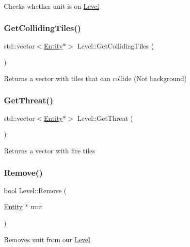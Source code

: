 Checks whether unit is on \mbox{\hyperlink{class_level}{Level}} \mbox{\label{class_level_a028dcbbb085a3d587fcd3ac14eddb103}} 
\subsubsection{\texorpdfstring{GetCollidingTiles()}{GetCollidingTiles()}}
{\footnotesize\ttfamily std\+::vector$<$\mbox{\hyperlink{class_entity}{Entity}}$\ast$$>$ Level\+::\+Get\+Colliding\+Tiles (\begin{DoxyParamCaption}{ }\end{DoxyParamCaption})}

Returns a vector with tiles that can collide (Not background) \mbox{\label{class_level_a5eff8099cd1bd25d3f40286956ddbf9a}} 
\subsubsection{\texorpdfstring{GetThreat()}{GetThreat()}}
{\footnotesize\ttfamily std\+::vector$<$\mbox{\hyperlink{class_entity}{Entity}}$\ast$$>$ Level\+::\+Get\+Threat (\begin{DoxyParamCaption}{ }\end{DoxyParamCaption})}

Returns a vector with fire tiles \mbox{\label{class_level_a30421d6ae3d5d0c71e2bca97a6b34901}} 
\subsubsection{\texorpdfstring{Remove()}{Remove()}}
{\footnotesize\ttfamily bool Level\+::\+Remove (\begin{DoxyParamCaption}\item[{\mbox{\hyperlink{class_entity}{Entity}} $\ast$}]{unit }\end{DoxyParamCaption})}

Removes unit from our \mbox{\hyperlink{class_level}{Level}} \mbox{\label{class_level_ae3eae8009b9fb300ca1cc6e55c998898}} 
